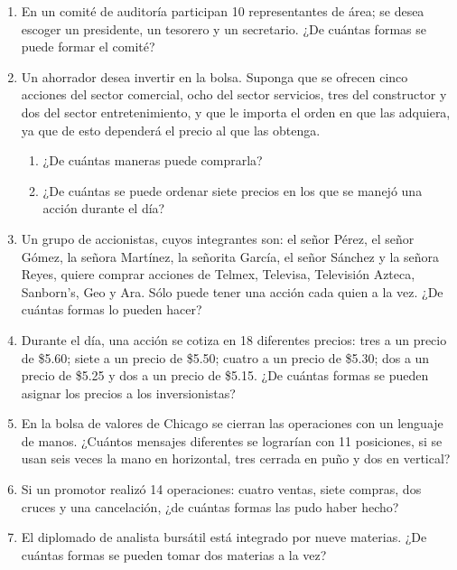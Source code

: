 \begin{Ejer}
\begin{enumerate}

\item En un comit\'e de auditor\'ia participan 10 representantes de \'area; se desea escoger un presidente, un tesorero y un secretario. ¿De cu\'antas formas se puede formar el comit\'e?

\item Un ahorrador desea invertir en la bolsa. Suponga que se ofrecen cinco acciones del sector comercial, ocho del sector servicios, tres del constructor y dos del sector entretenimiento, y que le importa el orden en que las adquiera, ya que de esto depender\'a el precio al que las obtenga.
\begin{enumerate}
\item ¿De cu\'antas maneras puede comprarla?
\item ¿De cu\'antas se puede ordenar siete precios en los que se manej\'o una acci\'on durante el d\'ia?
\end{enumerate}

\item Un grupo de accionistas, cuyos integrantes son: el se\~nor P\'erez, el se\~nor G\'omez, la se\~nora Mart\'inez, la se\~norita Garc\'ia, el se\~nor S\'anchez y la se\~nora Reyes, quiere comprar acciones de Telmex, Televisa, Televisi\'on Azteca, Sanborn's, Geo y Ara. S\'olo puede tener una acci\'on cada quien a la vez. ¿De cu\'antas formas lo pueden hacer?

\item Durante el d\'ia, una acci\'on se cotiza en 18 diferentes precios: tres a un precio de \$5.60; siete a un precio de \$5.50; cuatro a un precio de \$5.30; dos a un precio de \$5.25 y dos a un precio de \$5.15. ¿De cu\'antas formas se pueden asignar los precios a los inversionistas?

\item En la bolsa de valores de Chicago se cierran las operaciones con un lenguaje de manos. ¿Cu\'antos mensajes diferentes se lograr\'ian con 11 posiciones, si se usan seis veces la mano en horizontal, tres cerrada en pu\~no y dos en vertical?

\item Si un promotor realiz\'o 14 operaciones: cuatro ventas, siete compras, dos cruces y una cancelaci\'on, ¿de cu\'antas formas las pudo haber hecho?

\item El diplomado de analista burs\'atil est\'a integrado por nueve materias. ¿De cu\'antas formas se pueden tomar dos materias a la vez?


\end{enumerate}
\end{Ejer}
